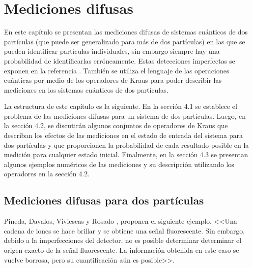 \chapter{Mediciones difusas}


 En este capítulo se presentan las mediciones difusas de sistemas cuánticos de dos partículas (que puede ser generalizado para más de dos partículas) en las que se pueden identificar partículas individuales, sin embargo siempre hay una probabilidad de identificarlas erróneamente. Estas detecciones imperfectas se exponen en la referencia {\cite{Pineda_2021}}. También se utiliza el lenguaje de las operaciones cuánticas por medio de los operadores de Kraus para poder describir las mediciones en los sistemas cuánticos de dos partículas.

La estructura de este capítulo es la siguiente. En la sección 4.1 se establece el problema de las mediciones difusas para un sistema de dos partículas. Luego, en la sección 4.2, se discutirán algunos conjuntos de operadores de Kraus que describan los efectos de las mediciones en el estado de entrada del sistema para dos partículas y que proporcionen la probabilidad de cada resultado posible en la medición  para cualquier estado inicial. Finalmente, en la sección 4.3 se presentan algunos ejemplos numéricos de las mediciones y su descripción utilizando los operadores en la sección 4.2.



\section{Mediciones difusas para dos partículas}

Pineda, Davalos, Viviescas y Rosado {\cite{Pineda_2021}}, proponen el siguiente ejemplo. <<Una cadena de iones se hace brillar  y se obtiene una señal fluorescente. Sin embargo, debido a la imperfecciones del detector, no es posible determinar
determinar el origen exacto de la señal fluorescente. La información obtenida en este caso se vuelve borrosa, pero su cuantificación aún es posible>>.

